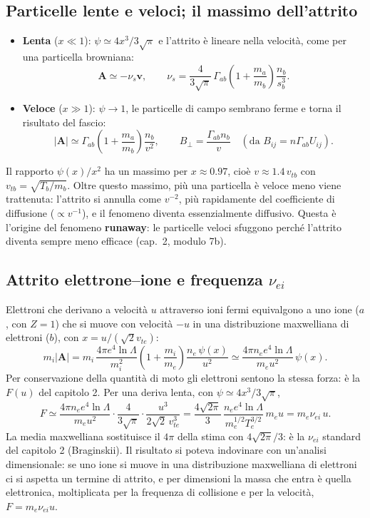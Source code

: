 \subsection{Particelle lente e veloci; il massimo dell'attrito}
\begin{itemize}
\item \textbf{Lenta} ($x\ll1$): $\psi\simeq4x^3/3\sqrt\pi$ e l'attrito è lineare nella velocità, come per una particella browniana:
\begin{equation}
\mathbf{A}\simeq-\nu_s\mathbf{v},\qquad\nu_s=\frac{4}{3\sqrt\pi}\,\Gamma_{ab}\left(1+\frac{m_a}{m_b}\right)\frac{n_b}{s_b^3}.
\end{equation}
\item \textbf{Veloce} ($x\gg1$): $\psi\to1$, le particelle di campo sembrano ferme e torna il risultato del fascio:
\begin{equation}
|\mathbf{A}|\simeq\Gamma_{ab}\left(1+\frac{m_a}{m_b}\right)\frac{n_b}{v^2},\qquad B_\perp=\frac{\Gamma_{ab}n_b}{v}\quad(\text{da }B_{ij}=n\Gamma_{ab}U_{ij}).
\end{equation}
\end{itemize}
Il rapporto $\psi(x)/x^2$ ha un massimo per $x\approx0.97$, cioè $v\approx1.4\,v_{tb}$ con $v_{tb}=\sqrt{T_b/m_b}$. Oltre questo massimo, più una particella è veloce meno viene trattenuta: l'attrito si annulla come $v^{-2}$, più rapidamente del coefficiente di diffusione ($\propto v^{-1}$), e il fenomeno diventa essenzialmente diffusivo. Questa è l'origine del fenomeno \textbf{runaway}: le particelle veloci sfuggono perché l'attrito diventa sempre meno efficace (cap.~2, modulo 7b).

\subsection{Attrito elettrone--ione e frequenza $\nu_{ei}$}
Elettroni che derivano a velocità $u$ attraverso ioni fermi equivalgono a uno ione ($a$, con $Z=1$) che si muove con velocità $-u$ in una distribuzione maxwelliana di elettroni ($b$), con $x=u/(\sqrt2v_{te})$:
\begin{equation}
m_i|\mathbf{A}|=m_i\,\frac{4\pi e^4\ln\Lambda}{m_i^2}\left(1+\frac{m_i}{m_e}\right)\frac{n_e\,\psi(x)}{u^2}\simeq\frac{4\pi n_ee^4\ln\Lambda}{m_eu^2}\,\psi(x).
\end{equation}
Per conservazione della quantità di moto gli elettroni sentono la stessa forza: è la $F(u)$ del capitolo 2. Per una deriva lenta, con $\psi\simeq4x^3/3\sqrt\pi$,
\begin{equation}
F\simeq\frac{4\pi n_ee^4\ln\Lambda}{m_eu^2}\cdot\frac{4}{3\sqrt\pi}\cdot\frac{u^3}{2\sqrt2\,v_{te}^3}=\frac{4\sqrt{2\pi}}{3}\,\frac{n_ee^4\ln\Lambda}{m_e^{1/2}T_e^{3/2}}\,m_eu=m_e\nu_{ei}\,u .
\end{equation}
La media maxwelliana sostituisce il $4\pi$ della stima con $4\sqrt{2\pi}/3$: è la $\nu_{ei}$ standard del capitolo 2 (Braginskii). Il risultato si poteva indovinare con un'analisi dimensionale: se uno ione si muove in una distribuzione maxwelliana di elettroni ci si aspetta un termine di attrito, e per dimensioni la massa che entra è quella elettronica, moltiplicata per la frequenza di collisione e per la velocità, $F=m_e\nu_{ei}u$.

